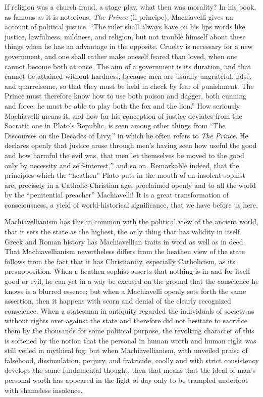 \documentclass[12pt,a4paper,openany]{book}
\newcommand{\opage}[1]{\marginnote{\footnotesize\textit{[#1]}}}
\begin{document}
If religion was a church fraud, a stage play, what
then was morality? In his book, as famous as it is notorious,
\emph{The Prince} (il principe), Machiavelli gives an account of
political justice. ``The ruler shall always have on
his lips words like justice, lawfulness, mildness, and
religion, but not trouble himself about these things when
he has an advantage in the opposite. Cruelty is necessary
for a new government, and one shall rather make
oneself feared than loved, when one cannot become both
at once. The aim of a government is its duration,
and that cannot be attained without hardness, because
men are usually ungrateful, false, and
\setcounter{footnote}{0}%
\opage{94}quarrelsome, so that they must be held in check by fear
of punishment. The Prince must therefore know how to use
both poison and dagger, both cunning and force; he must be able to
play both the fox and the lion.'' How seriously Machiavelli
means it, and how far his conception of
justice deviates from the Socratic one in Plato's Republic, is seen
among other things from ``The Discourses on the Decades of Livy,''
in which he often refers to \emph{The Prince}. He declares
openly that justice arose through men's
having seen how useful the good and how harmful
the evil was, that men let themselves be moved
to the good only by necessity and self-interest,'' and so on.
Remarkable indeed, that the principles which the ``heathen''
Plato puts in the mouth of an insolent
sophist are, precisely in a Catholic-Christian age, proclaimed
openly and to all the world by the ``penitential preacher'' Machiavelli!
It is a great transformation of consciousness, a yield of world-historical
significance, that we have before us here.

Machiavellianism has this in common with the political
view of the ancient world, that it sets the state as
the highest, the only thing that has validity in itself.
Greek and Roman history has Machiavellian
traits in word as well as in deed. That Machiavellianism
nevertheless differs from the heathen
view of the state follows from the fact that it has Christianity,
especially Catholicism, as its presupposition. When a heathen
sophist asserts that nothing is in and for itself good
or evil, he can yet in a way be excused on the ground
that the conscience he knows is a blurred
essence; but when a Machiavelli openly sets forth
the same assertion, then it happens with scorn %
and denial of the clearly recognized conscience.
\setcounter{footnote}{0}%
\opage{95}When a statesman in antiquity regarded the individuals of society
as without rights over against the state and therefore did not
hesitate to sacrifice them by the thousands for some
political purpose, the revolting character of this is
softened by the notion that the personal in
human worth and human right was still veiled in mythical
fog; but when Machiavellianism, with unveiled
praise of falsehood, dissimulation, perjury, and fratricide,
coolly and with strict consistency develops the same
fundamental thought, then that means that the ideal of man's
personal worth has appeared in the light of day only
to be trampled underfoot with shameless insolence.
\end{document}
